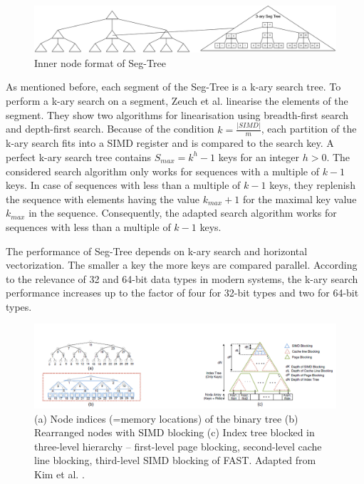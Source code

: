 \documentclass[runningheads,a4paper]{llncs}
\begin{document}
\begin{figure}
	\includegraphics[width=\textwidth]{SegTree}
	\caption{Inner node format of Seg-Tree}
	\label{fig}
\end{figure}

As mentioned before, each segment of the Seg-Tree is a k-ary search tree. To perform a k-ary search on a segment, Zeuch et al. linearise the elements of the segment. They show two algorithms for linearisation using breadth-first search and depth-first search. Because of the condition $k = \frac{\vert SIMD \vert }{m}$, each partition of the k-ary search fits into a SIMD register and is compared to the search key. A perfect k-ary search tree contains  $S_{max} = k^h - 1$ keys for an integer $h > 0$. The considered search algorithm only works for sequences with a multiple of $k-1$ keys. In case of  sequences with less than a multiple of $k-1$ keys, they replenish the sequence with elements having the value $k_{max} + 1$ for the maximal key value $k_{max}$ in the sequence. Consequently, the adapted search algorithm works for sequences with less than a multiple of $k-1$ keys.

The performance of Seg-Tree depends on k-ary search and horizontal vectorization. The smaller a key the more keys are compared parallel. According to the relevance of 32 and 64-bit data types in modern systems, the k-ary search performance increases up to the factor of four for 32-bit types and two for 64-bit types.

\begin{figure}
	\includegraphics[width=1.0\textwidth]{figure_3.png}
	\caption{(a) Node indices (=memory locations) of the binary tree (b) Rearranged nodes with SIMD blocking (c) Index tree blocked in three-level
		hierarchy – first-level page blocking, second-level cache line blocking, third-level SIMD blocking of FAST. Adapted from Kim et al. \cite{kim2010fast}.}
	\label{fig}
\end{figure}
\end{document}
